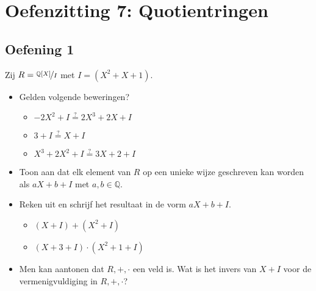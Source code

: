 \documentclass[main.tex]{subfiles}
\begin{document}
\section{Oefenzitting 7: Quotientringen}

\subsection*{Oefening 1}
Zij $R = \nicefrac{\mathbb{Q}[X]}{I}$ met $I=(X^{2}+X+1)$.

\begin{itemize}
\item Gelden volgende beweringen?
  \begin{itemize}
  \item $-2X^{2}+I \overset{?}{=} 2X^{3}+2X+I$
  \item $3+I\overset{?}{=} X+I$
  \item $X^{3}+2X^{2}+I \overset{?}{=} 3X+2+I$
  \end{itemize}
\item Toon aan dat elk element van $R$ op een unieke wijze geschreven kan worden als $aX+b+I$ met $a,b\in \mathbb{Q}$.
\item Reken uit en schrijf het resultaat in de vorm $aX+b+I$.
  \begin{itemize}
  \item $(X+I) + (X^{2}+I)$
  \item $(X+3+I)\cdot (X^{2}+1+I)$
  \end{itemize}
\item Men kan aantonen dat $R,+,\cdot$ een veld is.
  Wat is het invers van $X+I$ voor de vermenigvuldiging in $R,+,\cdot$?
\end{itemize}
\end{document}
